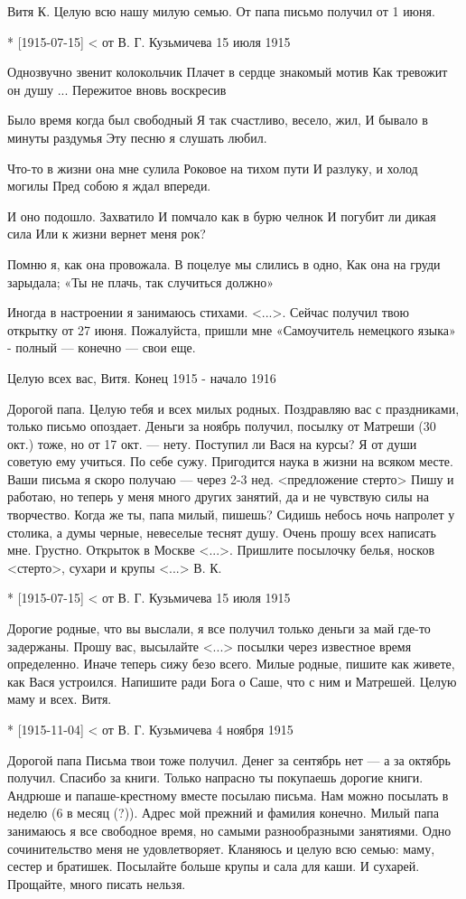 Витя К.
Целую всю нашу милую семью. От папа письмо получил от 1 июня.

* [1915-07-15] < от В. Г. Кузьмичева 
15 июля 1915

Однозвучно звенит колокольчик
Плачет в сердце знакомый мотив
Как тревожит он душу ...
Пережитое вновь воскресив

Было время когда был свободный
Я так счастливо, весело, жил,
И бывало в минуты раздумья
Эту песню я слушать любил.

Что-то в жизни она мне сулила
Роковое на тихом пути
И разлуку, и холод могилы
Пред собою я ждал впереди.

И оно подошло. Захватило
И помчало как в бурю челнок
И погубит ли дикая сила
Или к жизни вернет меня рок?

Помню я, как она провожала.
В поцелуе мы слились в одно,
Как она на груди зарыдала;
«Ты не плачь, так случиться должно»

Иногда в настроении я занимаюсь стихами. <...>. Сейчас получил твою открытку от 27 июня. Пожалуйста, пришли мне «Самоучитель немецкого языка» - полный — конечно — свои еще.

Целую всех вас, Витя.
Конец 1915 - начало 1916

Дорогой папа. Целую тебя и всех милых родных. Поздравляю вас с праздниками, только письмо опоздает. Деньги за ноябрь получил, посылку от Матреши (30 окт.) тоже, но от 17 окт. — нету. Поступил ли Вася на курсы? Я от души советую ему учиться. По себе сужу. Пригодится наука в жизни на всяком месте. Ваши письма я скоро получаю — через 2-3 нед. <предложение стерто>
Пишу и работаю, но теперь у меня много других занятий, да и не чувствую силы на творчество. Когда же ты, папа милый, пишешь? Сидишь небось ночь напролет у столика, а думы черные, невеселые теснят душу. Очень прошу всех написать мне. Грустно. Открыток в Москве <...>.
Пришлите посылочку белья, носков <стерто>, сухари и крупы <...> В. К.



* [1915-07-15] < от В. Г. Кузьмичева 
15 июля 1915

Дорогие родные, что вы выслали, я все получил только деньги за май где-то задержаны. Прошу вас, высылайте <...> посылки через известное время определенно. Иначе теперь сижу безо всего. Милые родные, пишите как живете, как Вася устроился. Напишите ради Бога о Саше, что с ним и Матрешей. Целую маму и всех. Витя.

* [1915-11-04] < от В. Г. Кузьмичева 
4 ноября 1915

Дорогой папа Письма твои тоже получил. Денег за сентябрь нет — а за октябрь получил. Спасибо за книги. Только напрасно ты покупаешь дорогие книги. Андрюше и папаше-крестному вместе посылаю письма. Нам можно посылать в неделю (6 в месяц (?)). Адрес мой прежний и фамилия конечно. Милый папа занимаюсь я все свободное время, но самыми разнообразными занятиями. Одно сочинительство меня не удовлетворяет. Кланяюсь и целую всю семью: маму, сестер и братишек. Посылайте больше крупы и сала для каши. И сухарей.
Прощайте, много писать нельзя.


